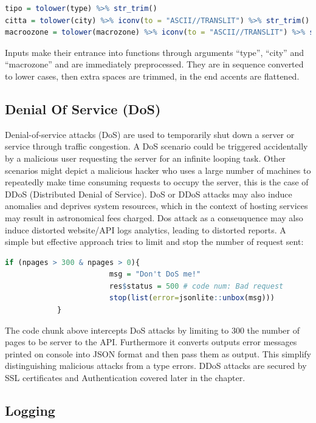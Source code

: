 \documentclass[
  12pt,
  a4paper,
  oneside]{book}
\theoremstyle{definition}
\theoremstyle{definition}
\theoremstyle{definition}
\theoremstyle{remark}
\begin{document}
\begin{lstlisting}[language=R]
tipo = tolower(type) %>% str_trim()
citta = tolower(city) %>% iconv(to = "ASCII//TRANSLIT") %>% str_trim()
macroozone = tolower(macrozone) %>% iconv(to = "ASCII//TRANSLIT") %>% str_trim()
\end{lstlisting}

Inputs make their entrance into functions through arguments ``type'', ``city'' and ``macrozone'' and are immediately preprocessed. They are in sequence converted to lower cases, then extra spaces are trimmed, in the end accents are flattened.

\hypertarget{DoS}{%
\subsection{Denial Of Service (DoS)}\label{DoS}}

Denial-of-service attacks (DoS) are used to temporarily shut down a server or service through traffic congestion. A DoS scenario could be triggered accidentally by a malicious user requesting the server for an infinite looping task. Other scenarios might depict a malicious hacker who uses a large number of machines to repeatedly make time consuming requests to occupy the server, this is the case of DDoS (Distributed Denial of Service). DoS or DDoS attacks may also induce anomalies and deprives system resources, which in the context of hosting services may result in astronomical fees charged. Dos attack as a conseuquence may also induce distorted website/API logs analytics, leading to distorted reports.
A simple but effective approach tries to limit and stop the number of request sent:

\begin{lstlisting}[language=R]
 if (npages > 300 & npages > 0){
                        msg = "Don't DoS me!"
                        res$status = 500 # code num: Bad request
                        stop(list(error=jsonlite::unbox(msg)))     
            }
\end{lstlisting}

The code chunk above intercepts DoS attacks by limiting to 300 the number of pages to be server to the API. Furthermore it converts outputs error messages printed on console into JSON format and then pass them as output. This simplify distinguishing malicious attacks from a type errors. DDoS attacks are secured by SSL certificates and Authentication covered later in the chapter.

\hypertarget{logging}{%
\subsection{Logging}\label{logging}}
\end{document}
